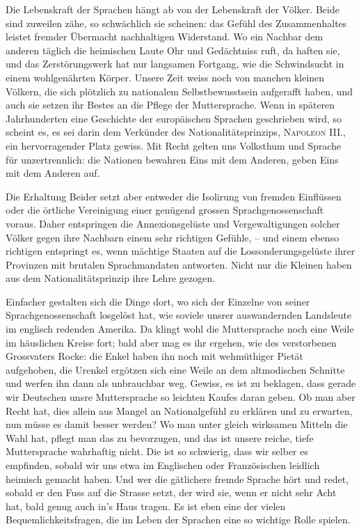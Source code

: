 {Die Lebenskraft der Sprachen hängt ab von der Lebenskraft der Völker. Beide sind zuweilen zähe, so schwächlich sie scheinen: das Gefühl des Zusammenhaltes leistet fremder Übermacht nachhaltigen Widerstand. Wo ein Nachbar dem anderen täglich die heimischen Laute  Ohr und Gedächtniss ruft, da haften sie, und das Zerstörungswerk hat nur langsamen Fortgang, wie die Schwindsucht in einem wohlgenährten Körper. Unsere Zeit weiss noch von manchen kleinen Völkern, die sich plötzlich zu  nationalem Selbstbewusstsein aufgerafft haben, und auch sie setzen ihr Bestes an die Pflege der Muttersprache. Wenn in späteren Jahrhunderten eine Geschichte der europäischen Sprachen geschrieben wird, so scheint es, es sei darin dem Verkünder des Nationalitätsprinzips, \textsc{Napoleon} III., ein hervorragender Platz gewiss. Mit Recht gelten uns Volksthum und Sprache für unzertrennlich: die Nationen bewahren Eins mit dem Anderen, geben Eins mit dem Anderen auf.

Die Erhaltung Beider setzt aber entweder die Isolirung von fremden Einflüssen oder die örtliche Vereinigung einer genügend grossen Sprachgenossen\-\label{sp.262}schaft voraus. Daher entspringen die Annexionsgelüste und Vergewaltigungen solcher Völker gegen ihre Nachbarn einem sehr richtigen Gefühle, – und einem ebenso richtigen entspringt es, wenn mächtige Staaten auf die Lossonderungsgelüste ihrer Provinzen mit brutalen Sprachmandaten antworten. Nicht nur die Kleinen haben aus dem Nationalitätsprinzip ihre Lehre gezogen.

Einfacher gestalten sich die Dinge dort, wo sich der Einzelne von seiner Sprachgenossenschaft losgelöst hat, wie soviele unsrer auswandernden Landsleute im englisch redenden Amerika. Da klingt wohl die \label{fp.257} Muttersprache noch eine Weile im häuslichen Kreise fort; bald aber mag es ihr ergehen, wie des verstorbenen Grossvaters Rocke: die Enkel haben ihn noch mit wehmüthiger Pietät aufgehoben, die Urenkel ergötzen sich eine Weile an dem altmodischen Schnitte und werfen ihn dann als unbrauchbar weg. Gewiss, es ist zu beklagen, dass gerade wir Deutschen unsre Muttersprache so leichten Kaufes daran geben. Ob man aber Recht hat, dies allein aus Mangel an Nationalgefühl zu erklären und zu erwarten, nun müsse es damit besser werden? Wo man unter gleich wirksamen Mitteln die Wahl hat, pflegt man das  zu bevorzugen, und das ist unsere reiche, tiefe Muttersprache wahrhaftig nicht. Die ist so schwierig, dass wir selber es empfinden, sobald wir uns etwa im Englischen oder Französischen leidlich heimisch gemacht haben. Und wer die gätlichere fremde Sprache hört und redet, sobald er den Fuss auf die Strasse setzt, der wird sie, wenn er nicht sehr Acht hat, bald genug auch in’s Haus tragen. Es ist eben eine der vielen Bequemlichkeitsfragen, die im Leben der Sprachen eine so wichtige Rolle spielen.

}

